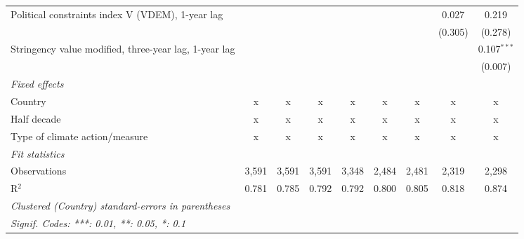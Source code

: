 \begin{table}[htbp]
\begin{tabular}{lcccccccc}
      Political constraints index V (VDEM), 1-year lag                                                &                &               &               &               &               &               & 0.027         & 0.219\\   
                                                                                                      &                &               &               &               &               &               & (0.305)       & (0.278)\\   
      Stringency value modified, three-year lag, 1-year lag                                           &                &               &               &               &               &               &               & 0.107$^{***}$\\   
                                                                                                      &                &               &               &               &               &               &               & (0.007)\\   
      \emph{Fixed effects}\\
      Country                                                                                         & x              & x             & x             & x             & x             & x             & x             & x\\  
      Half decade                                                                                     & x              & x             & x             & x             & x             & x             & x             & x\\  
      Type of climate action/measure                                                                  & x              & x             & x             & x             & x             & x             & x             & x\\  
      \midrule \emph{Fit statistics}\\
      Observations                                                                                    & 3,591          & 3,591         & 3,591         & 3,348         & 2,484         & 2,481         & 2,319         & 2,298\\  
      R$^2$                                                                                           & 0.781          & 0.785         & 0.792         & 0.792         & 0.800         & 0.805         & 0.818         & 0.874\\  
      \midrule
      \multicolumn{9}{l}{\emph{Clustered (Country) standard-errors in parentheses}}\\
      \multicolumn{9}{l}{\emph{Signif. Codes: ***: 0.01, **: 0.05, *: 0.1}}\\
   \end{tabular}
\end{table}


